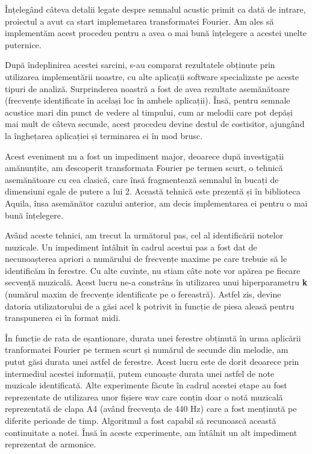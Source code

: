 \documentclass[a4paper,12pt]{report}
\begin{document}
    Înțelegând câteva detalii legate despre semnalul acustic primit ca dată de intrare, proiectul a avut ca start implemetarea transformatei Fourier. Am ales să implementăm acest procedeu pentru a avea o mai bună înțelegere a acestei unelte puternice. 
    
    După îndeplinirea acestei sarcini, s-au comparat rezultatele obținute prin utilizarea implementării noastre, cu alte aplicații software specializate pe aceste tipuri de analiză. Surprinderea noastră a fost de avea rezultate asemănătoare (frecvențe identificate în același loc în ambele aplicații). Însă, pentru semnale acustice mari din punct de vedere al timpului, cum ar melodii care pot depăși mai mult de câteva secunde, acest procedeu devine destul de costisitor, ajungând la înghețarea aplicației și terminarea ei în mod brusc. 
    
    Acest eveniment nu a fost un impediment major, deoarece după investigații amănunțite, am descoperit transformata Fourier pe termen scurt, o tehnică asemănătoare cu cea clasică, care însă fragmentează semnalul în bucați de dimensiuni egale de putere a lui 2. Această tehnică este prezentă și în biblioteca Aquila, însa asemănător cazului anterior, am decis implementarea ei pentru o mai bună înțelegere. 
    
    Având aceste tehnici, am trecut la următorul pas, cel al identificării notelor muzicale. Un impediment întâlnit în cadrul acestui pas a fost dat de necunoașterea apriori a numărului de frecvențe maxime pe care trebuie să le identificăm în ferestre. Cu alte cuvinte, nu stiam câte note vor apărea pe fiecare secvență muzicală. Acest lucru ne-a constrâns în utilizarea unui hiperparametru \textbf{k} (numărul maxim de frecvențe identificate pe o fereastră). Astfel zis, devine datoria utilizatorului de a găsi acel k potrivit în funcție de piesa aleasă pentru transpunerea ei în format midi.
    
    În funcție de rata de eșantionare, durata unei ferestre obținută în urma aplicării tranformatei Fourier pe termen scurt și numărul de secunde din melodie, am putut găsi durata unei astfel de ferestre. Acest lucru este de dorit deoarece prin intermediul acestei informații, putem cunoaște durata unei astfel de note muzicale identificată. Alte experimente făcute în cadrul acestei etape au fost reprezentate de utilizarea unor fișiere wav care conțin doar o notă muzicală reprezentată de clapa A4 (având frecvența de 440 Hz) care a fost menținută pe diferite perioade de timp. Algoritmul a fost capabil să recunoască această continuitate a notei. Însă în aceste experimente, am întâlnit un alt impediment reprezentat de armonice.
    
\end{document}
